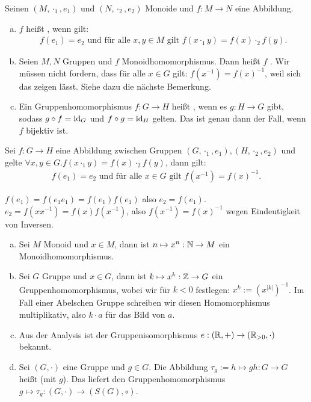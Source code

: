 \begin{definition}
  Seinen \((M,\cdot_1,e_1)\) und \((N,\cdot_2,e_2)\) Monoide und \(f:M\to N\) eine Abbildung.
  \begin{enumerate}[(a)]
  \item \(f\) heißt , wenn gilt:
    \begin{align*}
      f(e_1)=e_2\text{ und für alle \(x,y\in M\) gilt } f(x\cdot_1 y)=f(x)\cdot_2 f(y).
    \end{align*}
  \item Seien \(M,N\) Gruppen und \(f\) Monoidhomomorphismus. Dann heißt \(f\) . Wir müssen nicht fordern, dass für alle \(x\in G\) gilt: \(f(x^{-1})=f(x)^{-1}\), weil sich das zeigen lässt. Siehe dazu die nächste Bemerkung.
  \item Ein Gruppenhomomorphismus \(f:G\to H\) heißt ,
    wenn es \(g:H\to G\) gibt, sodass \(g\circ f=\mathrm{id}_G\) und \(f\circ g=\mathrm{id}_H\) gelten. Das ist genau dann der Fall, wenn \(f\) bijektiv ist.
  \end{enumerate}
\end{definition}

\begin{bemerkung}
  Sei \(f:G\to H\) eine Abbildung zwischen Gruppen \((G,\cdot_1,e_1),(H,\cdot_2,e_2)\) und gelte \(\forall x,y\in G. f(x\cdot_1y)=f(x)\cdot_2 f(y)\), dann gilt:
  \begin{align*}
    f(e_1)=e_2\text{ und für alle \(x\in G\) gilt }f(x^{-1})=f(x)^{-1}.
  \end{align*}
\end{bemerkung}

\begin{beweis}
  \(f(e_1)=f(e_1e_1)=f(e_1)f(e_1)\) also \(e_2=f(e_1)\). \(e_2=f(xx^{-1})=f(x)f(x^{-1})\), also \(f(x^{-1})=f(x)^{-1}\) wegen Eindeutigkeit von Inversen.
\end{beweis}

\begin{beispiel}
  \label{bsp-homs}
  \begin{enumerate}[(a)]
  \item Sei \(M\) Monoid und \(x\in M\), dann ist \(n\mapsto x^n:\mathbb{N}\to M\) ein Monoidhomomorphismus.
  \item Sei \(G\) Gruppe und \(x\in G\), dann ist \(k\mapsto x^k:\mathbb{Z}\to G\) ein Gruppenhomomorphismus, wobei wir für \(k<0\) festlegen: \(x^k:=(x^{|k|})^{-1}\). Im Fall einer Abelschen Gruppe schreiben wir diesen Homomorphismus multiplikativ, also \(k\cdot a\) für das Bild von \(a\).
  \item Aus der Analysis ist der Gruppenisomorphismus \(e:(\mathbb{R},+)\to (\mathbb{R}_{>0},\cdot)\) bekannt.
  \item\label{bsp-translation} Sei \((G,\cdot)\) eine Gruppe und \(g\in G\).
    Die Abbildung \(\tau_g:= h\mapsto gh :G\to G\) heißt  (mit \(g\)). Das liefert den Gruppenhomomorphismus \(g\mapsto \tau_g: (G,\cdot)\to (S(G),\circ)\).
  \end{enumerate}
\end{beispiel}

